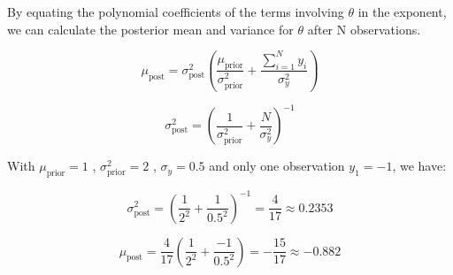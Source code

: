 \documentclass[12pt]{report}
\begin{document}
By equating the polynomial coefficients of the terms involving $\theta$ in the exponent, we can calculate the posterior mean and variance for $\theta$ after N observations.


\begin{equation}
\mu_{\text{post}} = \sigma_{\text{post}}^2 \left( \frac{\mu_{\text{prior}}}{\sigma_{\text{prior}}^2} + \frac{\sum_{i=1}^N y_i}{\sigma_y^2} \right)
\end{equation}


\begin{equation}    
\sigma_{\text{post}}^2 = \left( \frac{1}{\sigma_{\text{prior}}^2} + \frac{N}{\sigma_y^2} \right)^{-1}
\end{equation}


With \(\mu_{\text{prior}} = 1\) , \(\sigma_{\text{prior}}^2 = 2\) , \(\sigma_y = 0.5\) and only one observation \(y_1 = -1\), we have:


\begin{equation*}    
\sigma_{\text{post}}^2 = \left( \frac{1}{2^2} + \frac{1}{0.5^2} \right)^{-1} = \frac{4}{17} \approx 0.2353
\end{equation*}


\begin{equation*}
\mu_{\text{post}} = \frac{4}{17} \left( \frac{1}{2^2} + \frac{-1}{0.5^2} \right) = -\frac{15}{17} \approx -0.882
\end{equation*}
\end{document}

